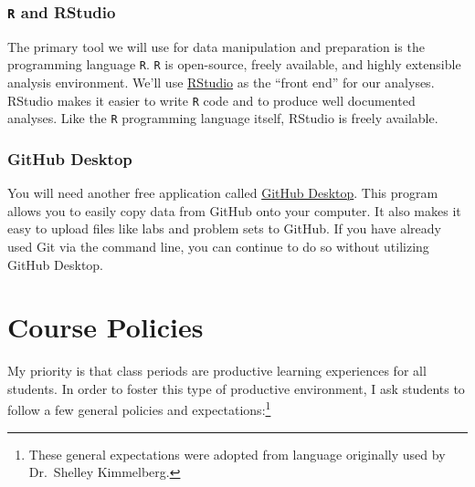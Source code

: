 \documentclass[
]{book}
\begin{document}
\hypertarget{r-and-rstudio}{%
\subsection{\texorpdfstring{\texttt{R} and RStudio}{R and RStudio}}\label{r-and-rstudio}}

The primary tool we will use for data manipulation and preparation is the programming language \texttt{R}. \texttt{R} is open-source, freely available, and highly extensible analysis environment. We'll use \href{https://www.rstudio.com}{RStudio} as the ``front end'' for our analyses. RStudio makes it easier to write \texttt{R} code and to produce well documented analyses. Like the \texttt{R} programming language itself, RStudio is freely available.

\hypertarget{github-desktop}{%
\subsection{GitHub Desktop}\label{github-desktop}}

You will need another free application called \href{https://desktop.github.com}{GitHub Desktop}. This program allows you to easily copy data from GitHub onto your computer. It also makes it easy to upload files like labs and problem sets to GitHub. If you have already used Git via the command line, you can continue to do so without utilizing GitHub Desktop.

\hypertarget{course-policies}{%
\chapter{Course Policies}\label{course-policies}}

My priority is that class periods are productive learning experiences for all students. In order to foster this type of productive environment, I ask students to follow a few general policies and expectations:\footnote{These general expectations were adopted from language originally used by Dr.~Shelley Kimmelberg.}
\end{document}
